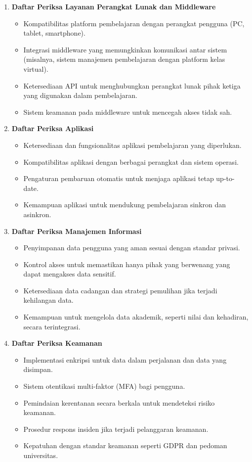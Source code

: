 \begin{enumerate}
\begin{enumerate}
		\item \textbf{Daftar Periksa Layanan Perangkat Lunak dan Middleware} 
		\begin{itemize}
			\item Kompatibilitas platform pembelajaran dengan perangkat pengguna (PC, tablet, smartphone).
			\item Integrasi middleware yang memungkinkan komunikasi antar sistem (misalnya, sistem manajemen pembelajaran dengan platform kelas virtual).
			\item Ketersediaan API untuk menghubungkan perangkat lunak pihak ketiga yang digunakan dalam pembelajaran.
			\item Sistem keamanan pada middleware untuk mencegah akses tidak sah.
		\end{itemize}
		
		\item \textbf{Daftar Periksa Aplikasi} 
		\begin{itemize}
			\item Ketersediaan dan fungsionalitas aplikasi pembelajaran yang diperlukan.
			\item Kompatibilitas aplikasi dengan berbagai perangkat dan sistem operasi.
			\item Pengaturan pembaruan otomatis untuk menjaga aplikasi tetap up-to-date.
			\item Kemampuan aplikasi untuk mendukung pembelajaran sinkron dan asinkron.
		\end{itemize}
		
		\item \textbf{Daftar Periksa Manajemen Informasi} 
		\begin{itemize}
			\item Penyimpanan data pengguna yang aman sesuai dengan standar privasi.
			\item Kontrol akses untuk memastikan hanya pihak yang berwenang yang dapat mengakses data sensitif.
			\item Ketersediaan data cadangan dan strategi pemulihan jika terjadi kehilangan data.
			\item Kemampuan untuk mengelola data akademik, seperti nilai dan kehadiran, secara terintegrasi.
		\end{itemize}
		
		\item \textbf{Daftar Periksa Keamanan} 
		\begin{itemize}
			\item Implementasi enkripsi untuk data dalam perjalanan dan data yang disimpan.
			\item Sistem otentikasi multi-faktor (MFA) bagi pengguna.
			\item Pemindaian kerentanan secara berkala untuk mendeteksi risiko keamanan.
			\item Prosedur respons insiden jika terjadi pelanggaran keamanan.
			\item Kepatuhan dengan standar keamanan seperti GDPR dan pedoman universitas.
		\end{itemize}
		

\end{enumerate}
\end{enumerate}
